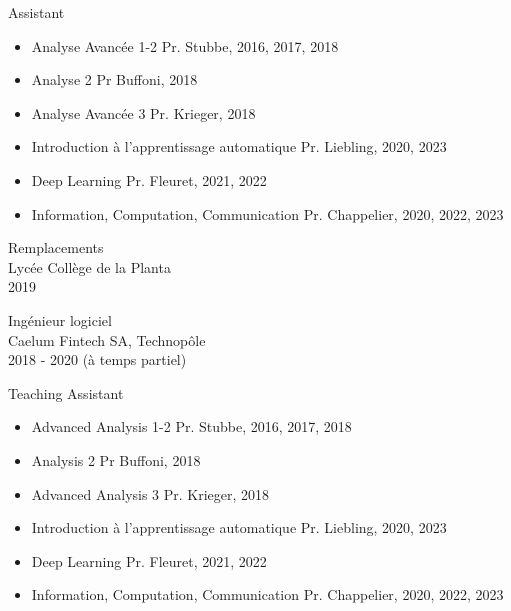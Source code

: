 \ifFrench

  \color{deepgray}
  \large Assistant
  \color{mediumgray} \small
  \begin{itemize}
    \item \color{deepgray}Analyse Avancée 1-2 \color{mediumgray} Pr. Stubbe, 2016, 2017, 2018
    \item \color{deepgray}Analyse 2 \color{mediumgray} Pr Buffoni, 2018
    \item \color{deepgray}Analyse Avancée 3 \color{mediumgray} Pr. Krieger, 2018
    \item \color{deepgray}Introduction à l'apprentissage automatique  \color{mediumgray} Pr. Liebling, 2020, 2023
    \item \color{deepgray}Deep Learning \color{mediumgray} Pr. Fleuret, 2021, 2022
    \item \color{deepgray}Information, Computation, Communication  \color{mediumgray} Pr. Chappelier, 2020, 2022, 2023
  \end{itemize}

  \vspace{4mm}
  \color{deepgray}
  \large Remplacements \\
  \color{mediumgray} \small
  Lycée Collège de la Planta \\
  2019

  \color{deepgray}
  \large Ingénieur logiciel \\
  \color{mediumgray} \small
  Caelum Fintech SA, Technopôle \\
  2018 - 2020 (à temps partiel)
  \vspace{4mm}
\else

  \color{deepgray}
  \large Teaching Assistant
  \color{mediumgray} \small
  \begin{itemize}
    \item \color{deepgray}Advanced Analysis 1-2  \color{mediumgray} Pr. Stubbe, 2016, 2017, 2018
    \item \color{deepgray}Analysis 2  \color{mediumgray} Pr Buffoni, 2018
    \item \color{deepgray}Advanced Analysis 3  \color{mediumgray} Pr. Krieger, 2018
    \item \color{deepgray}Introduction à l'apprentissage automatique  \color{mediumgray} Pr. Liebling, 2020, 2023
    \item \color{deepgray}Deep Learning  \color{mediumgray} Pr. Fleuret, 2021, 2022
    \item \color{deepgray}Information, Computation, Communication  \color{mediumgray} Pr. Chappelier, 2020, 2022, 2023
  \end{itemize}

